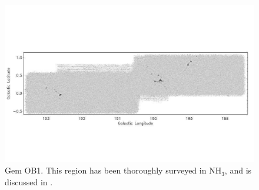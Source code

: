 \documentclass[12pt,preprint]{aastex}
\newcommand{\ammonia}{\mbox{{\rm NH}$_3$}}
\begin{document}
\addtocounter{figure}{-1}
\addtocounter{subfig}{1}

\begin{figure}
\begin{center}
  \includegraphics[scale=0.7]{f19i} \caption{Gem OB1.  This region
  has been thoroughly surveyed in \ammonia, and is discussed in
  \citet{dunham10}.}
\end{center}
\end{figure}

\renewcommand{\thefigure}{\arabic{figure}}

\clearpage
\end{document}
